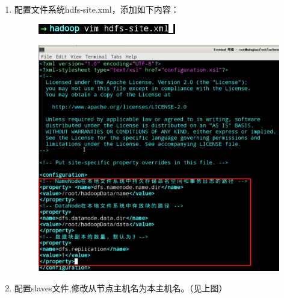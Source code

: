 \documentclass {article}
\begin{document}
\begin{enumerate}
					\item 配置文件系统hdfs-site.xml，添加如下内容：
					\begin{figure}[H]
						\centering
						\includegraphics{figures/fig23.png}
					\end{figure}
					\begin{figure}[H]
						\centering
						\includegraphics[width=4.5in]{figures/fig24.jpg}
					\end{figure}
				
					\item 配置slaves文件,修改从节点主机名为本主机名。（见上图）
				\end{enumerate}
		
\end{document}
